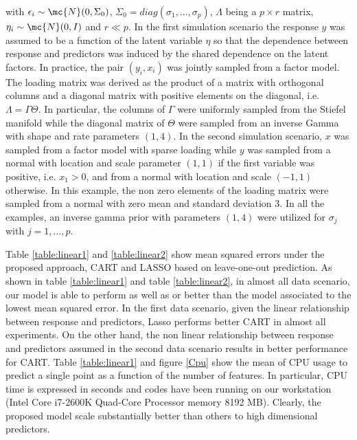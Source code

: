 with $\epsilon_i \sim \mc{N}(0,\Sigma_0)$, $\Sigma_0=diag(\sigma_1, \ldots, \sigma_p)$, $\Lambda$ being a $p \times r$ matrix, $\eta_i \sim \mc{N}(0,I)$ and $r\ll p$. In the first simulation scenario the response $y$ was assumed to be a function of the latent variable $\eta$ so that  the dependence between response and predictors was induced by the shared dependence on the latent factors. In practice, the pair $(y_i, x_i)$ was jointly sampled from a factor model. The loading matrix was derived as the product of a matrix with orthogonal columns and a diagonal matrix with positive elements on the diagonal, i.e. $\Lambda=\Gamma \Theta$. In particular, the columns of $\Gamma$ were uniformly sampled from the Stiefel manifold while the diagonal matrix of $\Theta$ were sampled from an inverse Gamma with shape and rate parameters $(1,4)$. In the second simulation scenario, $x$ was sampled from a factor model with sparse loading while $y$ was sampled from a normal with location and scale parameter $(1,1)$ if the first variable was positive, i.e. $x_1>0$, and from a normal with location and scale $(-1,1)$ otherwise.  In this example, the non zero elements of the loading matrix were sampled from a normal with zero mean and standard deviation $3$. In all the examples, an inverse gamma prior with parameters $(1,4)$ were utilized for $\sigma_j$ with $j=1, \ldots, p$.

Table \ref{table:linear1} and \ref{table:linear2} show mean squared errors under the proposed approach, CART and LASSO based on leave-one-out prediction. As shown in table \ref{table:linear1} and table \ref{table:linear2}, in almost all data scenario, our model is able to perform as well as or better than the model associated to the lowest mean squared error. In the first data scenario, given the linear relationship between response and predictors, Lasso performs better CART in almost all experiments. On the other hand, the non linear relationship between response and predictors assumed in the second data scenario results in better performance for CART. Table \ref{table:linear1} and figure \ref{Cpu} show the mean of CPU usage to predict a single point as a function of the number of features. In particular, CPU time is expressed in seconds and codes have been running on our workstation (Intel Core i7-2600K Quad-Core Processor memory 8192 MB).  Clearly, the proposed model scale substantially better than others to high dimensional predictors. 


